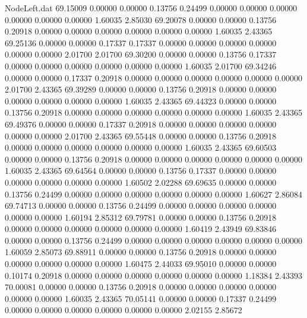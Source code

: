 \begin{filecontents}{NodeLeft.dat}
  69.15009    0.00000    0.00000     0.13756    0.24499    0.00000    0.00000    0.00000    0.00000    0.00000    0.00000    1.60035    2.85030
  69.20078    0.00000    0.00000     0.13756    0.20918    0.00000    0.00000    0.00000    0.00000    0.00000    0.00000    1.60035    2.43365
  69.25136    0.00000    0.00000     0.17337    0.17337    0.00000    0.00000    0.00000    0.00000    0.00000    0.00000    2.01700    2.01700
  69.30200    0.00000    0.00000     0.13756    0.17337    0.00000    0.00000    0.00000    0.00000    0.00000    0.00000    1.60035    2.01700
  69.34246    0.00000    0.00000     0.17337    0.20918    0.00000    0.00000    0.00000    0.00000    0.00000    0.00000    2.01700    2.43365
  69.39289    0.00000    0.00000     0.13756    0.20918    0.00000    0.00000    0.00000    0.00000    0.00000    0.00000    1.60035    2.43365
  69.44323    0.00000    0.00000     0.13756    0.20918    0.00000    0.00000    0.00000    0.00000    0.00000    0.00000    1.60035    2.43365
  69.49376    0.00000    0.00000     0.17337    0.20918    0.00000    0.00000    0.00000    0.00000    0.00000    0.00000    2.01700    2.43365
  69.55448    0.00000    0.00000     0.13756    0.20918    0.00000    0.00000    0.00000    0.00000    0.00000    0.00000    1.60035    2.43365
  69.60503    0.00000    0.00000     0.13756    0.20918    0.00000    0.00000    0.00000    0.00000    0.00000    0.00000    1.60035    2.43365
  69.64564    0.00000    0.00000     0.13756    0.17337    0.00000    0.00000    0.00000    0.00000    0.00000    0.00000    1.60502    2.02288
  69.69635    0.00000    0.00000     0.13756    0.24499    0.00000    0.00000    0.00000    0.00000    0.00000    0.00000    1.60627    2.86084
  69.74713    0.00000    0.00000     0.13756    0.24499    0.00000    0.00000    0.00000    0.00000    0.00000    0.00000    1.60194    2.85312
  69.79781    0.00000    0.00000     0.13756    0.20918    0.00000    0.00000    0.00000    0.00000    0.00000    0.00000    1.60419    2.43949
  69.83846    0.00000    0.00000     0.13756    0.24499    0.00000    0.00000    0.00000    0.00000    0.00000    0.00000    1.60059    2.85073
  69.88911    0.00000    0.00000     0.13756    0.20918    0.00000    0.00000    0.00000    0.00000    0.00000    0.00000    1.60475    2.44033
  69.95010    0.00000    0.00000     0.10174    0.20918    0.00000    0.00000    0.00000    0.00000    0.00000    0.00000    1.18384    2.43393
  70.00081    0.00000    0.00000     0.13756    0.20918    0.00000    0.00000    0.00000    0.00000    0.00000    0.00000    1.60035    2.43365
  70.05141    0.00000    0.00000     0.17337    0.24499    0.00000    0.00000    0.00000    0.00000    0.00000    0.00000    2.02155    2.85672

\end{filecontents}
